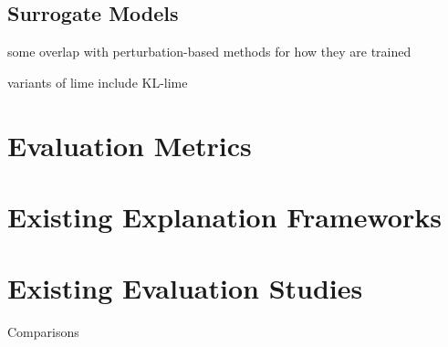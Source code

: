 \documentclass[main]{subfiles}
\begin{document}
\subsection{Surrogate Models}
some overlap with perturbation-based methods for how they are trained



variants of lime include KL-lime

\section{Evaluation Metrics}








\section{Existing Explanation Frameworks}



\section{Existing Evaluation Studies}

Comparisons
\end{document}
